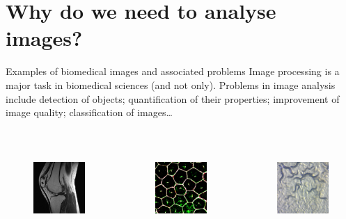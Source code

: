 \documentclass[9pt, aspectratio=169]{beamer}
\begin{document}
\section{Why do we need to analyse images?}

\begin{frame}
    {Examples of biomedical images and associated problems}
    Image processing is a major task in biomedical sciences (and not only).
    Problems in image analysis include detection of objects; quantification of their properties; improvement of image quality; classification of images\dots

    \begin{columns}
        \begin{column}{0.25\textwidth}
            \begin{figure}
                \includegraphics[height=10em]{MRI - Becky Stern CC-BY-SA2.jpg}
                \caption{\color{gray}{Becky Stern - CC-BY-SA 2.0}}
            \end{figure}
        \end{column}
        \begin{column}{0.25\textwidth}
            \begin{figure}
                \includegraphics[height=10em]{Retinal pigment epithelium - NIH - CC BY-NC 2.0.jpg}
                \caption{\color{gray}{NIH - CC-BY-SA 2.0}}
            \end{figure}
        \end{column}
        \begin{column}{0.25\textwidth}
            \begin{figure}
                \includegraphics[height=10em]{c elegans - Zeiss - CC-BY 2.0.jpg}

\end{figure}
\end{column}
\end{columns}
\end{frame}
\end{document}
